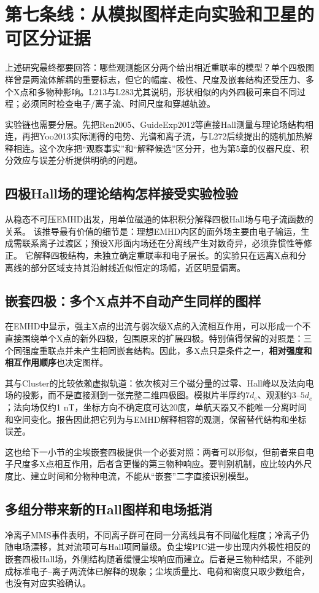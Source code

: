 \section{第七条线：从模拟图样走向实验和卫星的可区分证据}\label{story:diagnostic}
上述研究最终都要回答：哪些观测能区分两个给出相近重联率的模型？单个四极图样曾是两流体解耦的重要标志，但它的幅度、极性、尺度及嵌套结构还受压力、多个X点和多物种影响。L213与L283尤其说明，形状相似的内外四极可来自不同过程；必须同时检查电子/离子流、时间尺度和穿越轨迹。

实验链也需要分层。先把Ren2005、GuideExp2012等直接Hall测量与理论场结构相连，再把Yoo2013实际测得的电势、光谱和离子流，与L272后续提出的随机加热解释相连。这个次序把“观察事实”和“解释候选”区分开，也为第5章的仪器尺度、积分效应与误差分析提供明确的问题。

\subsection{四极Hall场的理论结构怎样接受实验检验}
\citet{L089}从稳态不可压EMHD出发，用单位磁通的体积积分解释四极Hall场与电子流函数的关系。
该推导最有价值的细节是：理想EMHD内区的面外场主要由电子输运，生成需联系离子过渡区；预设X形面内场还在分离线产生对数奇异，必须靠惯性等修正。
它解释四极结构，未独立确定重联率和电子层长。\citet{L119}的实验只在远离X点和分离线的部分区域支持其沿射线近似恒定的场幅，近区明显偏离。

\subsection{嵌套四极：多个X点并不自动产生同样的图样}\label{sec:synthesis-nested}
\citet{L213}在EMHD中显示，强主X点的出流与弱次级X点的入流相互作用，可以形成一个不直接围绕单个X点的新外四极，包围原来的扩展四极。特别值得保留的对照是：三个同强度重联点并未产生相同嵌套结构。因此，多X点只是条件之一，\textbf{相对强度和相互作用顺序}也决定图样。

其与Cluster的比较依赖虚拟轨道：依次核对三个磁分量的过零、Hall峰以及法向电场的投影，而不是直接测到一张完整二维四极图。模拟片半厚约$7d_e$、观测约$3$--$5d_e$；法向场仅约1 nT，坐标方向不确定度可达20度，单航天器又不能唯一分离时间和空间变化。报告因此把它列为与EMHD解释相容的观测，保留替代结构和坐标误差。

这也给下一小节的尘埃嵌套四极提供一个必要对照：两者可以形似，但前者来自电子尺度多X点相互作用，后者含更慢的第三物种响应。要判别机制，应比较内外尺度比、建立时间和分物种电流，不能从“嵌套”二字直接识别模型。

\subsection{多组分带来新的Hall图样和电场抵消}
冷离子MMS事件\citep{L227}表明，不同离子群可在同一分离线具有不同磁化程度；冷离子仍随电场漂移，其对流项可与Hall项同量级。负尘埃PIC\citep{L283}进一步出现内外极性相反的嵌套四极Hall场，外侧结构随着缓慢尘埃响应而建立。后者是三物种结果，不能列成标准电子--离子两流体已解释的现象；尘埃质量比、电荷和密度只取少数组合，也没有对应实验确认。

